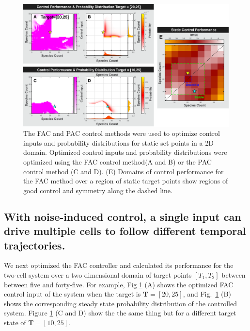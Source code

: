 \documentclass[12pt]{iopart}
\begin{document}
\begin{figure}
\begin{center}
\includegraphics[width=1\textwidth]{StaticControl.pdf}
\vspace{-0.1in}
\caption{The FAC and PAC control methods were used to optimize control inputs and probability distributions for static set points in a 2D domain.  Optimized control inputs and probability distributions were optimized using the FAC control method(A and B) or the PAC control method (C and D). (E) Domains of control performance for the FAC method over a region of static target points show regions of good control and symmetry along the dashed line.} 
\label{CtrlP}
\end{center}
\vspace{-0.2in}
\end{figure}

\subsection{With noise-induced control, a single input can drive multiple cells to follow different temporal trajectories.}

We next optimized the FAC controller and calculated its performance for the two-cell system over a two dimensional domain of target points $[T_1,T_2]$ between between five and forty-five. For example, Fig \ref{CtrlP} (A) shows the optimized FAC control input of the system when the target is $\mathbf{T}=[20,25]$, and Fig.\ \ref{CtrlP} (B) shows the corresponding steady state probability distribution of the controlled system.  Figure \ref{CtrlP} (C and D) show the the same thing but for a different target state of $\mathbf{T}=[10, 25]$.
\end{document}
